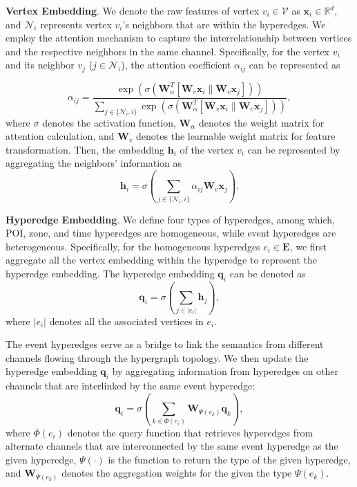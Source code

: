 \documentclass[letterpaper]{article} %
\begin{document}
\noindent\textbf{Vertex Embedding}.
We denote the raw features of vertex $v_i \in \mathcal{V}$ as $\mathbf{x}_i \in \mathbb{R}^d$, and $\mathcal{N}_i$ represents vertex $v_i$'s neighbors that are within the hyperedges.
We employ the attention mechanism to capture the interrelationship between vertices and the respective neighbors in the same channel.
Specifically, for the vertex $v_i$ and its neighbor $v_j$ ($j \in \mathcal{N}_i$), the attention coefficient $\alpha_{ij}$ can be represented as


\begin{equation}
\alpha_{ij} = \frac{\exp(\sigma(\mathbf{W}_{\alpha}^T[\mathbf{W}_v \mathbf{x}_i \| \mathbf{W}_v \mathbf{x}_j]))}{\sum_{j \in \{\mathcal{N}_i, i \}}\exp(\sigma( \mathbf{W}_{\alpha}^T[\mathbf{W}_v \mathbf{x}_i \| \mathbf{W}_v \mathbf{x}_j]))},
\end{equation}
where $\sigma$ denotes the activation function,  $\mathbf{W}_{\alpha}$ denotes the weight matrix for attention calculation, and $\mathbf{W}_v$ denotes the learnable weight matrix for feature transformation.
Then, the embedding $\mathbf{h}_i$ of the vertex $v_i$ can be represented by aggregating the neighbors' information as
\begin{equation}
\mathbf{h}_i = \sigma \left( \sum_{j \in \{\mathcal{N}_i, i   \} } \alpha_{ij} \mathbf{W}_v \mathbf{x}_j \right).
\end{equation}





\noindent\textbf{Hyperedge Embedding}.
We define four types of hyperedges,
among which, POI, zone, and time hyperedges are homogeneous, while event hyperedges are heterogeneous.
Specifically, for the homogeneous hyperedges $e_i \in \mathbf{E}$, we first aggregate all the vertex embedding within the hyperedge to represent the hyperedge embedding.
The hyperedge embedding  $\mathbf{q}_i$ can be denoted as
    \begin{equation}
    \mathbf{q}_i = \sigma \left(\sum_{j \in |e_i|} \mathbf{h}_j \right),
    \end{equation}
where $|e_i|$ denotes all the associated vertices in $e_i$.

The event hyperedges serve as a bridge to link the semantics from different channels flowing through the hypergraph topology.
We then update the hyperedge embedding $\mathbf{q}_i$ by aggregating information from hyperedges on other channels that are interlinked by the same event hyperedge:
\begin{equation}
    \mathbf{q}_i = \sigma \left( \sum_{k \in \Phi(e_i)} \mathbf{W}_{\Psi(e_k)} \mathbf{q}_k \right),
    \end{equation}
where $\Phi(e_i)$ denotes the query function that retrieves hyperedges from alternate channels that are interconnected by the same event hyperedge as the given hyperedge, $\Psi(\cdot)$ is the function to return the type of the given hyperedge,  and $\mathbf{W}_{\Psi(e_k)}$ denotes the aggregation weights for the given the type $\Psi(e_k)$.
\end{document}
